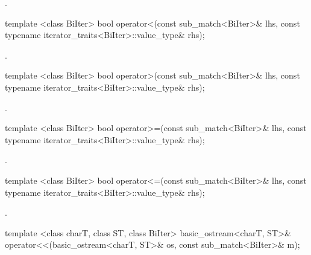 \begin{itemdescr}
\pnum
\returns {}.
\end{itemdescr}

%
\begin{itemdecl}
template <class BiIter>
  bool operator<(const sub_match<BiIter>& lhs,
                 const typename iterator_traits<BiIter>::value_type& rhs);
\end{itemdecl}

\begin{itemdescr}
\pnum
\returns {}.
\end{itemdescr}

%
\begin{itemdecl}
template <class BiIter>
  bool operator>(const sub_match<BiIter>& lhs,
                 const typename iterator_traits<BiIter>::value_type& rhs);
\end{itemdecl}

\begin{itemdescr}
\pnum
\returns {}.
\end{itemdescr}

%
\begin{itemdecl}
template <class BiIter>
  bool operator>=(const sub_match<BiIter>& lhs,
                  const typename iterator_traits<BiIter>::value_type& rhs);
\end{itemdecl}

\begin{itemdescr}
\pnum
\returns {}.
\end{itemdescr}

%
\begin{itemdecl}
template <class BiIter>
  bool operator<=(const sub_match<BiIter>& lhs,
                  const typename iterator_traits<BiIter>::value_type& rhs);
\end{itemdecl}

\begin{itemdescr}
\pnum
\returns {}.
\end{itemdescr}

%
%
\begin{itemdecl}
template <class charT, class ST, class BiIter>
  basic_ostream<charT, ST>&
  operator<<(basic_ostream<charT, ST>& os, const sub_match<BiIter>& m);
\end{itemdecl}

